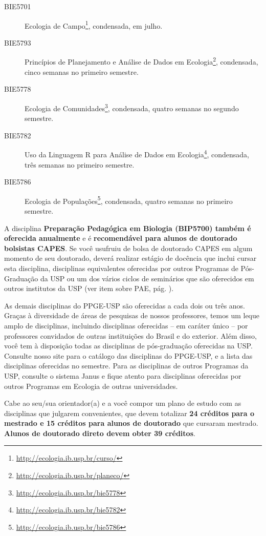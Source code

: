 \documentclass[twoside a4paper 12pt]{report}
\begin{document}
\begin{description}
  \item[BIE5701] Ecologia de Campo\footnote{\url{http://ecologia.ib.usp.br/curso/}}, condensada, em julho.
  \item[BIE5793] Princípios de Planejamento e Análise de Dados em Ecologia\footnote{\url{http://ecologia.ib.usp.br/planeco/}}, condensada, cinco semanas no primeiro semestre.
  \item[BIE5778] Ecologia de Comunidades\footnote{\url{http://ecologia.ib.usp.br/bie5778}}, condensada, quatro semanas no segundo semestre.
  \item[BIE5782] Uso da Linguagem R para Análise de Dados em Ecologia\footnote{\url{http://ecologia.ib.usp.br/bie5782}}, condensada, três semanas no primeiro semestre.
  \item[BIE5786] Ecologia de Populações\footnote{\url{http://ecologia.ib.usp.br/bie5786}}, condensada, quatro semanas no primeiro semestre.
\end{description}

A disciplina \textbf{Preparação Pedagógica em Biologia (BIP5700)
  também é oferecida anualmente} e é \textbf{recomendável para alunos
  de doutorado bolsistas CAPES}. Se você usufruiu de bolsa de
doutorado CAPES em algum momento de seu doutorado, deverá realizar
estágio de docência que inclui cursar esta disciplina, disciplinas
equivalentes oferecidas por outros Programas de Pós-Graduação da USP
ou um dos vários ciclos de seminários que são oferecidos em outros
institutos da USP (ver item sobre PAE, pág. \pageref{subsec:pae}).

As demais disciplinas do PPGE-USP são oferecidas a cada dois ou três
anos. Graças à diversidade de áreas de pesquisas de nossos
professores, temos um leque amplo de disciplinas, incluindo
disciplinas oferecidas -- em caráter único -- por professores
convidados de outras instituições do Brasil e do exterior. Além disso,
você tem à disposição todas as disciplinas de pós-graduação oferecidas
na USP. Consulte nosso site para o catálogo das disciplinas do
PPGE-USP, e a lista das disciplinas oferecidas no semestre. Para as
disciplinas de outros Programas da USP, consulte o sistema Janus e
fique atento para disciplinas oferecidas por outros Programas em
Ecologia de outras universidades.

Cabe ao seu/sua orientador(a) e a você compor um plano de estudo com as disciplinas que julgarem convenientes, que devem totalizar \textbf{24 créditos para o mestrado e 15 créditos para alunos de doutorado} que cursaram mestrado. \textbf{Alunos de doutorado direto devem obter 39 créditos}.
\end{document}
